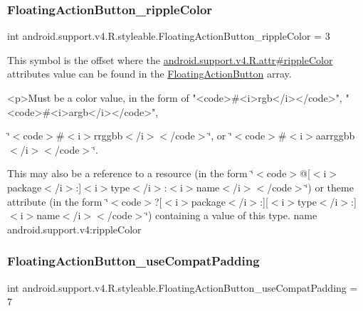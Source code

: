 \subsubsection{\texorpdfstring{Floating\+Action\+Button\+\_\+ripple\+Color}{FloatingActionButton\_rippleColor}}
{\footnotesize\ttfamily int android.\+support.\+v4.\+R.\+styleable.\+Floating\+Action\+Button\+\_\+ripple\+Color = 3\hspace{0.3cm}{\ttfamily [static]}}

This symbol is the offset where the \hyperlink{classandroid_1_1support_1_1v4_1_1R_1_1attr_a883228f1bbc2373c6a179b2e8e914e61}{android.\+support.\+v4.\+R.\+attr\#ripple\+Color} attribute\textquotesingle{}s value can be found in the \hyperlink{classandroid_1_1support_1_1v4_1_1R_1_1styleable_ad3363bb32f8e5e0dde36b5e32146816b}{Floating\+Action\+Button} array.

\begin{DoxyVerb}      <p>Must be a color value, in the form of "<code>#<i>rgb</i></code>", "<code>#<i>argb</i></code>",
\end{DoxyVerb}
 \char`\"{}$<$code$>$\#$<$i$>$rrggbb$<$/i$>$$<$/code$>$\char`\"{}, or \char`\"{}$<$code$>$\#$<$i$>$aarrggbb$<$/i$>$$<$/code$>$\char`\"{}. 

This may also be a reference to a resource (in the form \char`\"{}$<$code$>$@\mbox{[}$<$i$>$package$<$/i$>$\+:\mbox{]}$<$i$>$type$<$/i$>$\+:$<$i$>$name$<$/i$>$$<$/code$>$\char`\"{}) or theme attribute (in the form \char`\"{}$<$code$>$?\mbox{[}$<$i$>$package$<$/i$>$\+:\mbox{]}\mbox{[}$<$i$>$type$<$/i$>$\+:\mbox{]}$<$i$>$name$<$/i$>$$<$/code$>$\char`\"{}) containing a value of this type.  name android.\+support.\+v4\+:ripple\+Color \mbox{\label{classandroid_1_1support_1_1v4_1_1R_1_1styleable_ac4a76f5791185c567f07299a6c3327e0}} 
\subsubsection{\texorpdfstring{Floating\+Action\+Button\+\_\+use\+Compat\+Padding}{FloatingActionButton\_useCompatPadding}}
{\footnotesize\ttfamily int android.\+support.\+v4.\+R.\+styleable.\+Floating\+Action\+Button\+\_\+use\+Compat\+Padding = 7\hspace{0.3cm}{\ttfamily [static]}}

